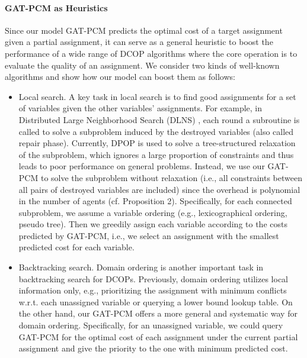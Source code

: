 \documentclass[letterpaper]{article} %
\begin{document}
\paragraph{GAT-PCM as Heuristics}
Since our model GAT-PCM predicts the optimal cost of a target assignment given a partial assignment, it can serve as a general heuristic to boost the performance of a wide range of DCOP algorithms where the core operation is to evaluate the quality of an assignment. We consider two kinds of well-known algorithms and show how our model can boost them as follows:
\begin{itemize}
    \item Local search. A key task in local search is to find good assignments for a set of variables given the other variables' assignments. For example, in Distributed Large Neighborhood Search (DLNS) \cite{hoang2018large} , each round a subroutine is called to solve a subproblem induced by the destroyed variables (also called repair phase). Currently, DPOP \cite{petcuscalable} is used to solve a tree-structured relaxation of the subproblem, which ignores a large proportion of constraints and thus leads to poor performance on general problems. 
    Instead, we use our GAT-PCM to solve the subproblem without relaxation (i.e., all constraints between all pairs of destroyed variables are included) since the overhead is polynomial in the number of agents (cf. Proposition 2). Specifically, for each connected subproblem, we assume a variable ordering (e.g., lexicographical ordering, pseudo tree). Then we greedily assign each variable according to the costs predicted by GAT-PCM, i.e., we select an assignment with the smallest predicted cost for each variable.
    
    \item Backtracking search. Domain ordering is another important task in backtracking search for DCOPs. Previously, domain ordering utilizes local information only, e.g., prioritizing the assignment with minimum conflicts w.r.t. each unassigned variable \cite{frost1995look} or querying a lower bound lookup table. On the other hand, our GAT-PCM offers a more general and systematic way for domain ordering. Specifically, for an unassigned variable, we could query GAT-PCM for the optimal cost of each assignment under the current partial assignment and give the priority to the one with minimum predicted cost.
\end{itemize}
\end{document}
